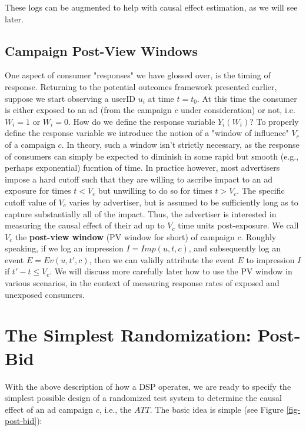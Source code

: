 \documentclass[11pt,a4paper]{article}
\theoremstyle{definition}
\theoremstyle{remark}
\theoremstyle{definition}
\theoremstyle{definition}
\theoremstyle{definition}
\theoremstyle{definition}
\theoremstyle{definition}
\theoremstyle{definition}
\begin{document}
These logs can be augmented to help with causal effect estimation, as we will see later.


\subsection{Campaign Post-View Windows}\label{sec-pv}

One aspect of consumer "responses" we have glossed over, is the timing of response. Returning to the potential outcomes framework presented earlier, suppose we start observing a userID $u_i$ at time $t = t_0$. At this time the consumer is either exposed to an ad (from the campaign $c$ under consideration) or not, i.e. $W_i = 1$ or $W_i=0$. How do we define the response variable $Y_i(W_i)$? To properly define the response variable we introduce the notion of a "window of influence" $V_c$ of a campaign $c$. In theory, such a window isn't strictly necessary, as the response of consumers can simply be expected to diminish in some rapid but smooth (e.g., perhaps exponential) fucntion of time. In practice however, most advertisers impose a hard cutoff such that they are willing to ascribe impact to an ad exposure for times $t < V_c$ but unwilling to do so for times $t > V_c$. The specific cutoff value of $V_c$ varies by advertiser, but is assumed to be sufficiently long as to capture substantially all of the impact. Thus, the advertiser is interested in measuring the causal effect of their ad up to $V_c$ time units post-exposure. We call $V_c$ the {\bf post-view window} (PV window for short) of campaign $c$. Roughly speaking, if we log an impression $I = Imp(u,t,c)$, and subsequently log an event $E = Ev(u,t',c)$, then we can validly attribute the event $E$ to impression $I$ if $t' - t \leq V_c$. We will discuss more carefully later how to use the PV window in various scenarios, in the context of measuring response rates of exposed and unexposed consumers.


\section{The Simplest Randomization: Post-Bid} \label{sec-psa}

With the above description of how a DSP operates, we are ready to specify the simplest possible design of a randomized test system to determine the causal effect of an ad campaign $c$, i.e., the $ATT$. 
The basic idea is simple (see Figure \ref{fig-post-bid}):
\end{document}
